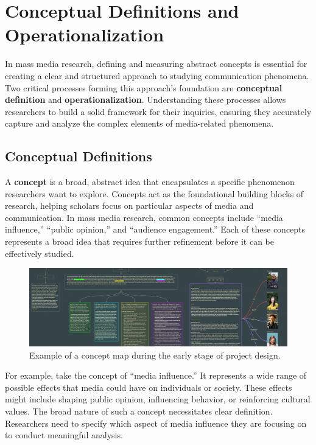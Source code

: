 \documentclass[
]{book}
\begin{document}
\section{Conceptual Definitions and Operationalization}\label{conceptual-definitions-and-operationalization}

In mass media research, defining and measuring abstract concepts is essential for creating a clear and structured approach to studying communication phenomena. Two critical processes forming this approach's foundation are \textbf{conceptual definition} and \textbf{operationalization}. Understanding these processes allows researchers to build a solid framework for their inquiries, ensuring they accurately capture and analyze the complex elements of media-related phenomena.

\subsection*{Conceptual Definitions}\label{conceptual-definitions}

A \textbf{concept} is a broad, abstract idea that encapsulates a specific phenomenon researchers want to explore. Concepts act as the foundational building blocks of research, helping scholars focus on particular aspects of media and communication. In mass media research, common concepts include ``media influence,'' ``public opinion,'' and ``audience engagement.'' Each of these concepts represents a broad idea that requires further refinement before it can be effectively studied.

\begin{figure}
\centering
\includegraphics[width=1\linewidth,height=\textheight,keepaspectratio]{images/concept-map.png}
\caption{Example of a concept map during the early stage of project design.}
\end{figure}

For example, take the concept of ``media influence.'' It represents a wide range of possible effects that media could have on individuals or society. These effects might include shaping public opinion, influencing behavior, or reinforcing cultural values. The broad nature of such a concept necessitates clear definition. Researchers need to specify which aspect of media influence they are focusing on to conduct meaningful analysis.
\end{document}
